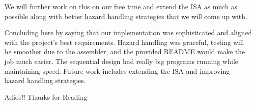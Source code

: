 \documentclass{article}
\numberwithin{figure}{section}
\numberwithin{table}{section}
\begin{document}
We will further work on this on our free time and extend the ISA as much as possible along with better hazard handling strategies that we will come up with. 

Concluding here by saying that our implementation was sophisticated and aligned with the project's best requirements. Hazard handling was graceful, testing will be smoother due to the assembler, and the provided README would make the job much easier. The sequential design had really big programs running while maintaining speed. Future work includes extending the ISA and improving hazard handling strategies.

Adios!! Thanks for Reading


\end{document}
